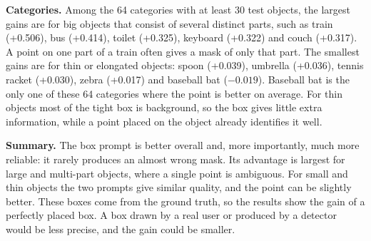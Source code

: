\textbf{Categories.} Among the 64 categories with at least 30 test objects, the largest gains are for big objects that consist of several distinct parts, such as train (+0.506), bus (+0.414), toilet (+0.325), keyboard (+0.322) and couch (+0.317). A point on one part of a train often gives a mask of only that part. The smallest gains are for thin or elongated objects: spoon (+0.039), umbrella (+0.036), tennis racket (+0.030), zebra (+0.017) and baseball bat ($-0.019$). Baseball bat is the only one of these 64 categories where the point is better on average. For thin objects most of the tight box is background, so the box gives little extra information, while a point placed on the object already identifies it well.

\textbf{Summary.} The box prompt is better overall and, more importantly, much more reliable: it rarely produces an almost wrong mask. Its advantage is largest for large and multi-part objects, where a single point is ambiguous. For small and thin objects the two prompts give similar quality, and the point can be slightly better. These boxes come from the ground truth, so the results show the gain of a perfectly placed box. A box drawn by a real user or produced by a detector would be less precise, and the gain could be smaller.
